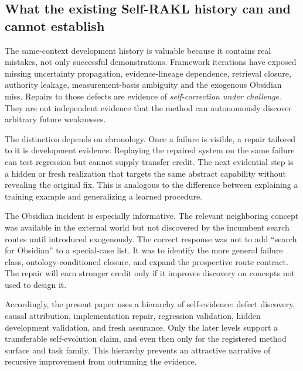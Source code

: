 \subsection{What the existing Self-RAKL history can and cannot establish}

The same-context development history is valuable because it contains real mistakes, not only successful demonstrations. Framework iterations have exposed missing uncertainty propagation, evidence-lineage dependence, retrieval closure, authority leakage, measurement-basis ambiguity and the exogenous Obsidian miss. Repairs to those defects are evidence of \emph{self-correction under challenge}. They are not independent evidence that the method can autonomously discover arbitrary future weaknesses.

The distinction depends on chronology. Once a failure is visible, a repair tailored to it is development evidence. Replaying the repaired system on the same failure can test regression but cannot supply transfer credit. The next evidential step is a hidden or fresh realization that targets the same abstract capability without revealing the original fix. This is analogous to the difference between explaining a training example and generalizing a learned procedure.

The Obsidian incident is especially informative. The relevant neighboring concept was available in the external world but not discovered by the incumbent search routes until introduced exogenously. The correct response was not to add ``search for Obsidian'' to a special-case list. It was to identify the more general failure class, ontology-conditioned closure, and expand the prospective route contract. The repair will earn stronger credit only if it improves discovery on concepts not used to design it.

Accordingly, the present paper uses a hierarchy of self-evidence: defect discovery, causal attribution, implementation repair, regression validation, hidden development validation, and fresh assurance. Only the later levels support a transferable self-evolution claim, and even then only for the registered method surface and task family. This hierarchy prevents an attractive narrative of recursive improvement from outrunning the evidence.
